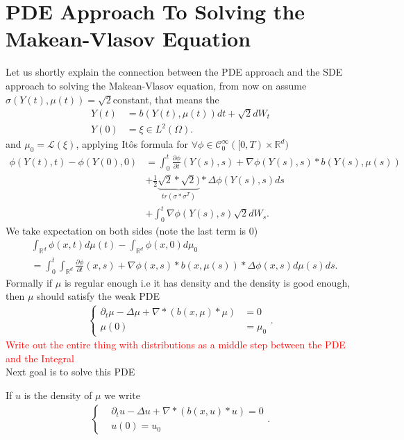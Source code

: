 \section{PDE Approach To Solving the Makean-Vlasov Equation}
Let us shortly explain the connection between the PDE approach and the SDE approach to solving the Makean-Vlasov equation,
from now on assume $\sigma(Y(t),\mu(t)) = \sqrt{2} $constant, that means the 
 \begin{align*}
   Y(t) &= b(Y(t),\mu(t)) dt + \sqrt{2} dW_t\\
   Y(0) &= \xi \in  L^{2}(\Omega ) 
 .\end{align*}
 and $\mu_0 = \mathcal{L}(\xi)$, applying It\^os formula for $\forall \phi  \in  \mathcal{C}_0^{\infty}([0,T)\times \mathbb{R}^{d} ) $
\begin{align*}
  \phi(Y(t),t) - \phi(Y(0),0) &= \int_0^{t} \frac{\partial \phi }{\partial t}(Y(s),s) + \nabla \phi(Y(s),s)*b(Y(s),\mu(s))  \\
                              &+ \frac{1}{2} \underbrace{\sqrt{2}*\sqrt{2})}_{tr(\sigma *\sigma ^{T} )}* \Delta \phi(Y(s),s) ds \\
                              &+ \int_0^{t} \nabla \phi(Y(s),s)  \sqrt{2} dW_s 
.\end{align*}
We take expectation  on both sides (note the last term is 0)  
\begin{align*}
  &\int_{\mathbb{R}^{d} } \phi(x,t) d\mu(t) - \int_{\mathbb{R}^{d} } \phi(x,0) d\mu_0 \\
  &= \int_0^{t} \int_{\mathbb{R}^{d} } \frac{\partial \phi }{\partial t}(x,s) + \nabla \phi(x,s)*b(x,\mu(s))* \Delta \phi(x,s)  d\mu(s) ds
.\end{align*}
Formally if $\mu$ is regular enough i.e it has density and the density is good enough, then $\mu $ should satisfy the weak PDE
\begin{align*}
  \begin{cases}
    \partial_t \mu  - \Delta \mu  + \nabla * (b(x,\mu) * \mu )  &=0\\
    \mu(0) &= \mu_0
  \end{cases}
.\end{align*}
\textcolor{Red}{Write out the entire thing with distributions as a middle step between the PDE and the Integral}\\[1ex]
Next goal is to solve this PDE
\begin{definition}
  If $u$ is the density of $\mu $ we write 
  \begin{align*}
  \begin{cases}
    &\partial_t u  - \Delta u  + \nabla * (b(x,u)*u )  =0\\
                                                      &u(0) = u_0
  \end{cases}
.\end{align*}
\end{definition}
